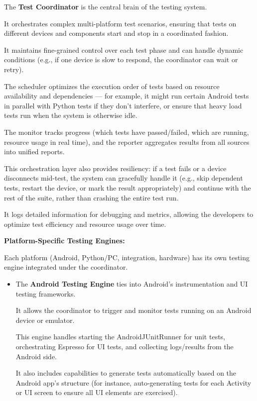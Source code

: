 {{The \textbf{Test Coordinator}
 is the central brain of the testing system.

It orchestrates complex multi-platform test scenarios, ensuring that tests on
different devices and components start and stop in a coordinated fashion.

It maintains fine-grained control over each test phase and can handle dynamic
conditions (e.g., if one device is slow to respond, the coordinator can wait or
retry).

The scheduler optimizes the execution order of tests based on resource
availability and dependencies --- for example, it might run certain Android
tests in parallel with Python tests if they don't interfere, or ensure that
heavy load tests run when the system is otherwise idle.

The monitor tracks progress (which tests have passed/failed, which are running,
resource usage in real time), and the reporter aggregates results from all
sources into unified reports.

This orchestration layer also provides resiliency: if a test fails or a device
disconnects mid-test, the system can gracefully handle it (e.g., skip dependent
tests, restart the device, or mark the result appropriately) and continue with
the rest of the suite, rather than crashing the entire test run.

It logs detailed information for debugging and metrics, allowing the developers
to optimize test efficiency and resource usage over time.

\textbf{Platform-Specific Testing Engines:}

Each platform (Android, Python/PC, integration, hardware) has its own testing
engine integrated under the coordinator.

\begin{itemize}

\item The \textbf{Android Testing Engine}
 ties into Android's instrumentation and UI testing frameworks.

It allows the coordinator to trigger and monitor tests running on an Android
device or emulator.

This engine handles starting the AndroidJUnitRunner for unit tests,
orchestrating Espresso for UI tests, and collecting logs/results from the
Android side.

It also includes capabilities to generate tests automatically based on the
Android app's structure (for instance, auto-generating tests for each Activity
or UI screen to ensure all UI elements are exercised).


\end{itemize}}}
